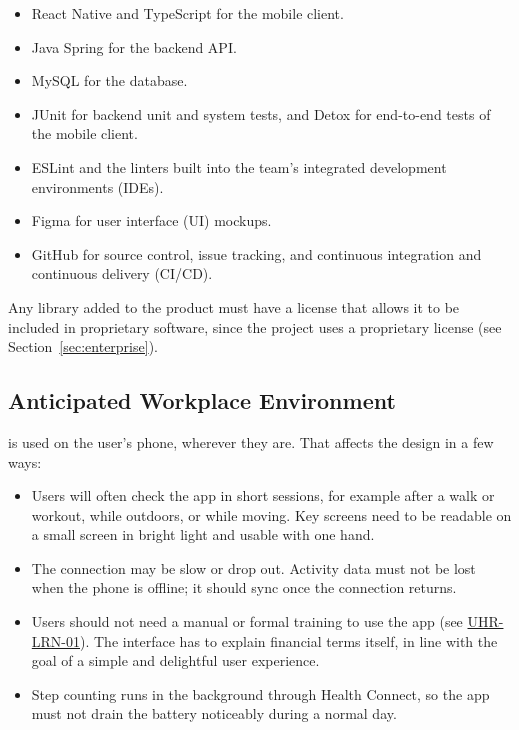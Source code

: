 \documentclass[12pt]{article}
\newcommand{\acr}[3]{\phantomsection\label{acr:#1}#2 (#3)}
\begin{document}
\begin{itemize}
  \item React Native and TypeScript for the mobile client.
  \item Java Spring for the backend API.
  \item MySQL for the database.
  \item JUnit for backend unit and system tests, and Detox for end-to-end tests
  of the mobile client.
  \item ESLint and the linters built into the team's \acr{IDE}{integrated development environments}{IDEs}.
  \item Figma for \acr{UI}{user interface}{UI} mockups.
  \item GitHub for source control, issue tracking, and \acr{CICD}{continuous integration and continuous delivery}{CI/CD}.
\end{itemize}

Any library added to the product must have a license that allows it to be
included in proprietary software, since the project uses a proprietary
license (see Section~\ref{sec:enterprise}).

\subsection{Anticipated Workplace Environment}

\progname{} is used on the user's phone, wherever they are. That affects
the design in a few ways:

\begin{itemize}
  \item Users will often check the app in short sessions, for example after a
  walk or workout, while outdoors, or while moving. Key screens need to be
  readable on a small screen in bright light and usable with one hand.
  \item The connection may be slow or drop out. Activity data must not be lost
  when the phone is offline; it should sync once the connection returns.
  \item Users should not need a manual or formal training to use the app (see
  \hyperlink{req:UHR-LRN-01}{UHR-LRN-01}). The interface has to explain financial terms itself, in line with the goal of a simple and delightful user
  experience.
  \item Step counting runs in the background through Health Connect, so the
  app must not drain the battery noticeably during a normal day.
\end{itemize}
\end{document}
